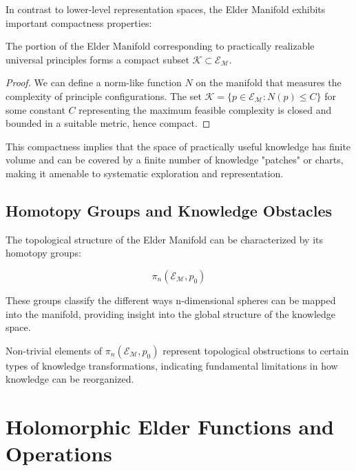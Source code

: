 In contrast to lower-level representation spaces, the Elder Manifold exhibits important compactness properties:

\begin{theorem}
The portion of the Elder Manifold corresponding to practically realizable universal principles forms a compact subset $\mathcal{K} \subset \mathcal{E}_{\mathcal{M}}$.
\end{theorem}

\begin{proof}
We can define a norm-like function $N$ on the manifold that measures the complexity of principle configurations. The set $\mathcal{K} = \{p \in \mathcal{E}_{\mathcal{M}} : N(p) \leq C\}$ for some constant $C$ representing the maximum feasible complexity is closed and bounded in a suitable metric, hence compact.
\end{proof}

This compactness implies that the space of practically useful knowledge has finite volume and can be covered by a finite number of knowledge "patches" or charts, making it amenable to systematic exploration and representation.

\subsection{Homotopy Groups and Knowledge Obstacles}

The topological structure of the Elder Manifold can be characterized by its homotopy groups:

\begin{equation}
\pi_n(\mathcal{E}_{\mathcal{M}}, p_0)
\end{equation}

These groups classify the different ways n-dimensional spheres can be mapped into the manifold, providing insight into the global structure of the knowledge space.

\begin{proposition}
Non-trivial elements of $\pi_n(\mathcal{E}_{\mathcal{M}}, p_0)$ represent topological obstructions to certain types of knowledge transformations, indicating fundamental limitations in how knowledge can be reorganized.
\end{proposition}

\section{Holomorphic Elder Functions and Operations}

